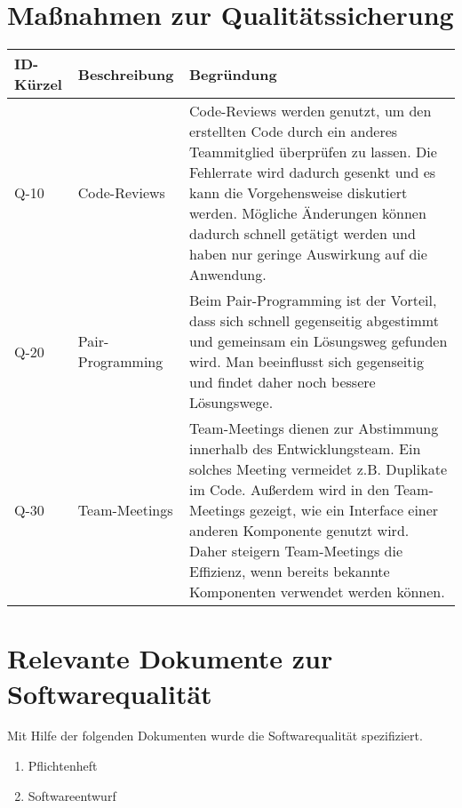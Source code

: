 \section{Maßnahmen zur Qualitätssicherung}
\begin{tabularx}{\textwidth}{|l|X|X|}
    \toprule
    \textbf{ID-Kürzel} & \textbf{Beschreibung} & \textbf{Begründung}\\
    \midrule
    \endhead
    \hline
    \caption{Qualitätssicherung}    
    \endfoot    
    Q-10 & Code-Reviews & Code-Reviews werden genutzt, um den erstellten Code durch ein anderes Teammitglied überprüfen zu lassen. Die Fehlerrate wird 		dadurch gesenkt und es kann die Vorgehensweise diskutiert werden. Mögliche Änderungen können dadurch schnell getätigt werden und haben nur 		geringe Auswirkung auf die Anwendung.  \\ \hline
    Q-20 & Pair-Programming & Beim Pair-Programming ist der Vorteil, dass sich schnell gegenseitig abgestimmt und gemeinsam ein Lösungsweg  		gefunden wird. Man beeinflusst sich gegenseitig und findet daher noch bessere Lösungswege.\\ \hline
    Q-30 & Team-Meetings & Team-Meetings dienen zur Abstimmung innerhalb des Entwicklungsteam. Ein solches Meeting vermeidet z.B. Duplikate im 		Code. Außerdem wird in den Team-Meetings gezeigt, wie ein Interface einer anderen Komponente genutzt wird. Daher steigern Team-Meetings die 	Effizienz, wenn bereits bekannte Komponenten verwendet werden können.\\  
\end{tabularx}

\section{Relevante Dokumente zur Softwarequalität}


Mit Hilfe der folgenden Dokumenten wurde die Softwarequalität spezifiziert.
\begin{enumerate}
\item Pflichtenheft
\item Softwareentwurf


\end{enumerate}






